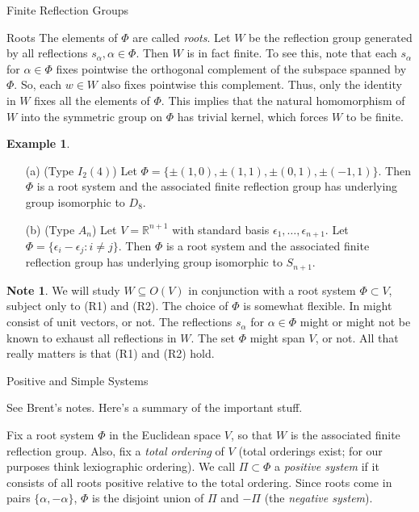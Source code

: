 \documentclass[12pt]{nauthesis}
\theoremstyle{definition}
\newtheorem{example}[theorem]{Example}
\newtheorem{note}[theorem]{Note}
\newcommand{\R}{\mathbb{R}}
\renewcommand{\(}{\big(}
\renewcommand{\)}{\big)}
\begin{document}
\begin{flushleft}
\begin{chapter}{Finite Reflection Groups}
\begin{section}{Roots}
The elements of $\Phi$ are called \emph{roots}.  Let $W$ be the reflection group generated by all reflections $s_\alpha, \alpha \in \Phi$.  Then $W$ is in fact finite.  To see this, note that each $s_\alpha$ for $\alpha \in \Phi$ fixes pointwise the orthogonal complement of the subspace spanned by $\Phi$.  So, each $w \in W$ also fixes pointwise this complement.  Thus, only the identity in $W$ fixes all the elements of $\Phi$.  This implies that the natural homomorphism of $W$ into the symmetric group on $\Phi$ has trivial kernel, which forces $W$ to be finite.

\medskip

\begin{example}
\ 
\begin{enumerate}
  \item[(a)] (Type $I_2(4)$)  Let $\Phi=\{\pm(1,0), \pm(1,1), \pm(0,1), \pm(-1,1)\}$.  Then $\Phi$ is a root system and the associated finite reflection group has underlying group isomorphic to $D_8$.
  \item[(b)] (Type $A_n$)  Let $V=\R^{n+1}$ with standard basis $\epsilon_1, \dots, \epsilon_{n+1}$.  Let $\Phi=\{\epsilon_i -\epsilon_j : i \neq j \}$.  Then $\Phi$ is a root system and the associated finite reflection group has underlying group isomorphic to $S_{n+1}$.
\end{enumerate}
\end{example}

\begin{note}
We will study $W \subseteq O(V)$ in conjunction with a root system $\Phi \subset V$, subject only to (R1) and (R2).  The choice of $\Phi$ is somewhat flexible.  In might consist of unit vectors, or not.  The reflections $s_\alpha$ for $\alpha \in \Phi$ might or might not be known to exhaust all reflections in $W$.  The set $\Phi$ might span $V$, or not.  All that really matters is that (R1) and (R2) hold.
\end{note}

\end{section}


\begin{section}{Positive and Simple Systems}

See Brent's notes.  Here's a summary of the important stuff.

\medskip

Fix a root system $\Phi$ in the Euclidean space $V$, so that $W$ is the associated finite reflection group.  Also, fix a \emph{total ordering} of $V$ (total orderings exist; for our purposes think lexiographic ordering). We call $\Pi \subset \Phi$ a \emph{positive system} if it consists of all roots positive relative to the total ordering.  Since roots come in pairs $\{\alpha, -\alpha\}$, $\Phi$ is the disjoint union of $\Pi$ and $-\Pi$ (the \emph{negative system}).


\end{section}
\end{chapter}
\end{flushleft}
\end{document}
